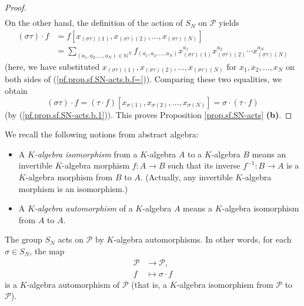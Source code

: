 \begin{fineprint}
\begin{proof}
\begin{align*}
\end{align*}
On the other hand, the definition of the action of $S_{N}$ on $\mathcal{P}$
yields%
\begin{align*}
\left(  \sigma\tau\right)  \cdot f  &  =f\left[  x_{\left(  \sigma\tau\right)
\left(  1\right)  },x_{\left(  \sigma\tau\right)  \left(  2\right)  }%
,\ldots,x_{\left(  \sigma\tau\right)  \left(  N\right)  }\right] \\
&  =\sum_{\left(  a_{1},a_{2},\ldots,a_{N}\right)  \in\mathbb{N}^{N}%
}f_{\left(  a_{1},a_{2},\ldots,a_{N}\right)  }x_{\left(  \sigma\tau\right)
\left(  1\right)  }^{a_{1}}x_{\left(  \sigma\tau\right)  \left(  2\right)
}^{a_{2}}\cdots x_{\left(  \sigma\tau\right)  \left(  N\right)  }^{a_{N}}%
\end{align*}
(here, we have substituted $x_{\left(  \sigma\tau\right)  \left(  1\right)
},x_{\left(  \sigma\tau\right)  \left(  2\right)  },\ldots,x_{\left(
\sigma\tau\right)  \left(  N\right)  }$ for $x_{1},x_{2},\ldots,x_{N}$ on both
sides of (\ref{pf.prop.sf.SN-acts.b.f=})). Comparing these two equalities, we
obtain%
\[
\left(  \sigma\tau\right)  \cdot f=\left(  \tau\cdot f\right)  \left[
x_{\sigma\left(  1\right)  },x_{\sigma\left(  2\right)  },\ldots
,x_{\sigma\left(  N\right)  }\right]  =\sigma\cdot\left(  \tau\cdot f\right)
\]
(by (\ref{pf.prop.sf.SN-acts.b.1})). This proves Proposition
\ref{prop.sf.SN-acts} \textbf{(b)}.
\end{proof}
\end{fineprint}

We recall the following notions from abstract algebra:

\begin{itemize}
\item A $K$\emph{-algebra isomorphism} from a $K$-algebra $A$ to a $K$-algebra
$B$ means an invertible $K$-algebra morphism $f:A\rightarrow B$ such that its
inverse $f^{-1}:B\rightarrow A$ is a $K$-algebra morphism from $B$ to $A$.
(Actually, any invertible $K$-algebra morphism is an isomorphism.)

\item A $K$\emph{-algebra automorphism} of a $K$-algebra $A$ means a
$K$-algebra isomorphism from $A$ to $A$.
\end{itemize}

\begin{proposition}
\label{prop.sf.SN-acts-by-alg-auts}The group $S_{N}$ acts on $\mathcal{P}$ by
$K$-algebra automorphisms. In other words, for each $\sigma\in S_{N}$, the map%
\begin{align*}
\mathcal{P}  &  \rightarrow\mathcal{P},\\
f  &  \mapsto\sigma\cdot f
\end{align*}
is a $K$-algebra automorphism of $\mathcal{P}$ (that is, a $K$-algebra
isomorphism from $\mathcal{P}$ to $\mathcal{P}$).
\end{proposition}

